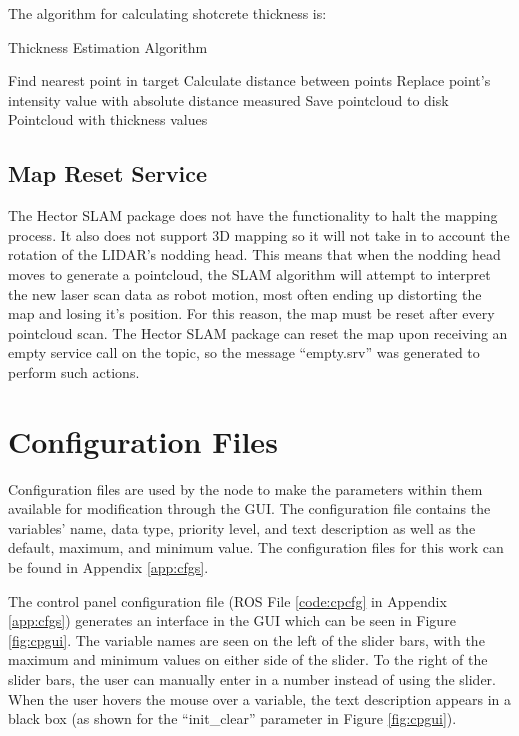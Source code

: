 The algorithm for calculating shotcrete thickness is:

\begin{algorithm}[H]
\caption{Thickness Estimation Algorithm}
\label{alg:thick}
\begin{algorithmic}[1]
\begin{raggedright}
\State Find nearest point in target
\State Calculate distance between points
\State Replace point's intensity value with absolute distance measured
\EndFor
\State Save pointcloud to disk
\EndFunction\\
\Return Pointcloud with thickness values
\end{raggedright}
\end{algorithmic}
\end{algorithm}

\subsection{Map Reset Service}
The Hector SLAM package does not have the functionality to halt the mapping process. It also does not support 3D mapping so it will not take in to account the rotation of the LIDAR's nodding head. This means that when the nodding head moves to generate a pointcloud, the SLAM algorithm will attempt to interpret the new laser scan data as robot motion, most often ending up distorting the map and losing it's position. For this reason, the map must be reset after every pointcloud scan. The Hector SLAM package can reset the map upon receiving an empty service call on the  topic, so the message ``empty.srv'' was generated to perform such actions.\\

\section{Configuration Files}
Configuration files are used by the  node to make the parameters within them available for modification through the  GUI. The configuration file contains the variables' name, data type, priority level, and text description as well as the default, maximum, and minimum value. The configuration files for this work can be found in Appendix \ref{app:cfgs}.

The control panel configuration file (ROS File \ref{code:cpcfg} in Appendix \ref{app:cfgs}) generates an interface in the  GUI which can be seen in Figure \ref{fig:cpgui}. The variable names are seen on the left of the slider bars, with the maximum and minimum values on either side of the slider. To the right of the slider bars, the user can manually enter in a number instead of using the slider. When the user hovers the mouse over a variable, the text description appears in a black box (as shown for the ``init\_clear'' parameter in Figure \ref{fig:cpgui}).

